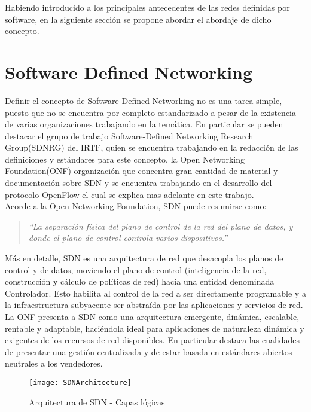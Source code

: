 Habiendo introducido a los principales antecedentes de las redes definidas por software, en la siguiente secci\'on se propone abordar el abordaje de dicho concepto.

\section{Software Defined Networking}
\label{section2.2}

Definir el concepto de Software Defined Networking no es una tarea simple, puesto que no se encuentra por completo estandarizado a pesar de la existencia de varias organizaciones trabajando en la temática. En particular se pueden destacar el grupo de trabajo Software-Defined Networking Research Group(SDNRG) del IRTF, quien se encuentra trabajando en la redacción de las definiciones y estándares para este concepto, la Open Networking Foundation(ONF) organización que concentra gran cantidad de material y documentación sobre SDN y se encuentra trabajando en el desarrollo del protocolo OpenFlow el cual se explica mas adelante en este trabajo.\\

Acorde a la Open Networking Foundation, SDN puede resumirse como:

\begin{quote}
\textit{``La separación física del plano de control de la red del plano de datos, y donde el plano de control controla varios dispositivos.''}
\end{quote}

Más en detalle, SDN es una arquitectura de red que desacopla los planos de control y de datos, moviendo el plano de control (inteligencia de la red, construcción y c\'alculo de políticas de red) hacia una entidad denominada Controlador. Esto habilita al control de la red a ser directamente programable y a la infraestructura subyacente ser abstraída por las aplicaciones y servicios de red.\\ 

La ONF presenta a SDN como una arquitectura emergente, dinámica, escalable, rentable y adaptable, haciéndola ideal para aplicaciones de naturaleza dinámica y exigentes de los recursos de red disponibles. En particular destaca las cualidades de presentar una gestión centralizada y de estar basada en estándares abiertos neutrales a los vendedores.\\

\begin{figure}[htbp!] 
\centering    
\texttt{[image: SDNArchitecture]}
\caption[Arquitectura de SDN - Capas lógicas]{Arquitectura de SDN - Capas lógicas}
\label{fig:SDNArchitecture}
\end{figure}

